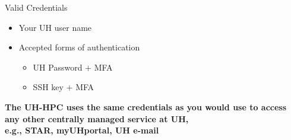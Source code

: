 \begin{frame}
\begin{block}{Valid Credentials}
		\begin{itemize}
			\item Your UH user name
			\item Accepted forms of authentication
			\begin{itemize}\scriptsize
				\item UH Password $+$ MFA 
				\item SSH key $+$ MFA
			\end{itemize}
		\end{itemize}
	\end{block}
	\begin{center}\scriptsize
	\textbf{The UH-HPC uses the same credentials as you would use to access any other centrally managed service at UH,\\e.g., STAR, myUHportal, UH e-mail}
	\end{center}
\end{frame}


